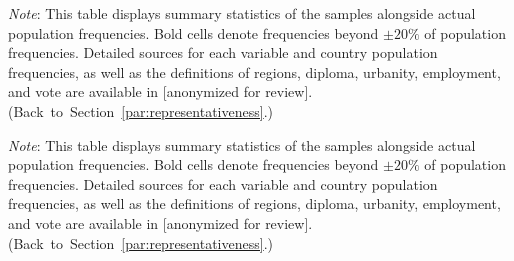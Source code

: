 %         

\begin{table}[h!]
    \caption[Sample representativeness in FR, DE, IT]{Sample representativeness in France, Germany, Italy. %
    } \label{tab:representativeness_1}
    \makebox[\textwidth][c]{
        \resizebox*{!}{.60\textheight}{%
        
        }
    }
    {\footnotesize \textit{Note}: This table displays summary statistics of the samples alongside actual population frequencies. Bold cells denote frequencies beyond $\pm 20\%$ of population frequencies. 
    Detailed sources for each variable and country population frequencies, as well as the definitions of regions, diploma, urbanity, employment, and vote are available in [anonymized for review]. %
    \hfill (Back~to~Section~\ref{par:representativeness}.) %
    } 
\end{table}

\begin{table}[h!]
    \caption[Sample representativeness in PL, ES, GB, CH]{Sample representativeness in Poland, Spain, the UK, Switzerland. %
    } \label{tab:representativeness_2}
    \makebox[\textwidth][c]{\resizebox*{!}{.60\textheight}{}}
    {\footnotesize \textit{Note}: This table displays summary statistics of the samples alongside actual population frequencies. Bold cells denote frequencies beyond $\pm 20\%$ of population frequencies. 
    Detailed sources for each variable and country population frequencies, as well as the definitions of regions, diploma, urbanity, employment, and vote are available in [anonymized for review]. %
    \hfill (Back~to~Section~\ref{par:representativeness}.) %
    } 
\end{table}

